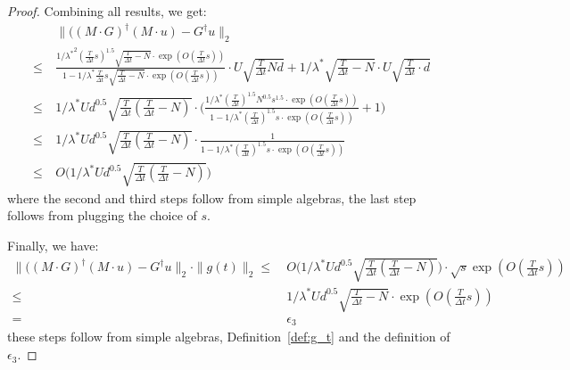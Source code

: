 \begin{proof}
    Combining all results, we get:
    \begin{align*}
        & ~ \| ((M \cdot G)^\dagger (M \cdot u) - G^\dagger u \|_2 \\
        \leq & ~ \frac{{1/\lambda^*}^2 (\frac{T}{\Delta t} s)^{1.5} \sqrt{\frac{T}{\Delta t} - N} \cdot \exp(O(\frac{T}{\Delta t}s))}{1 - {1/\lambda^*} \frac{T}{\Delta t} s \sqrt{\frac{T}{\Delta t} - N}\cdot \exp(O(\frac{T}{\Delta t}s)) } \cdot U \sqrt{\frac{T}{\Delta t} N d} + 1/\lambda^* \sqrt{\frac{T}{\Delta t} - N} \cdot U \sqrt{\frac{T}{\Delta t} \cdot d} \\
        \leq & ~ 1/\lambda^* U d^{0.5}  \sqrt{\frac{T}{\Delta t} (\frac{T}{\Delta t} - N)}  \cdot \Big( \frac{ {1/\lambda^*} (\frac{T}{\Delta t})^{1.5} N^{0.5} s^{1.5}  \cdot \exp(O(\frac{T}{\Delta t}s))}{1 - {1/\lambda^*} (\frac{T}{\Delta t})^{1.5} s \cdot \exp(O(\frac{T}{\Delta t}s))} + 1 \Big) \\
        \leq & ~ 1/\lambda^* U d^{0.5}  \sqrt{\frac{T}{\Delta t} (\frac{T}{\Delta t} - N)}  \cdot  \frac{ 1}{1 - {1/\lambda^*} (\frac{T}{\Delta t})^{1.5} s \cdot \exp(O(\frac{T}{\Delta t}s))}  \\
        \leq & ~ O\Big( 1/\lambda^* U d^{0.5}  \sqrt{\frac{T}{\Delta t} (\frac{T}{\Delta t} - N)}\Big)
    \end{align*}
    where the second and third steps follow from simple algebras, the last step follows from plugging the choice of $s$.

    Finally, we have:
    \begin{align*}
        \| ((M \cdot G)^\dagger (M \cdot u) - G^\dagger u \|_2 \cdot \| g(t) \|_2 
        \leq & ~ O\Big( 1/\lambda^* U d^{0.5}  \sqrt{\frac{T}{\Delta t} (\frac{T}{\Delta t} - N)}\Big) \cdot \sqrt{s} \exp(O(\frac{T}{\Delta t}s)) \\
        \leq & ~ 1/\lambda^* U d^{0.5} \sqrt{\frac{T}{\Delta t} - N} \cdot \exp(O(\frac{T}{\Delta t}s))  \\
        = & ~ \epsilon_3
    \end{align*}
    these steps follow from simple algebras, Definition~\ref{def:g_t} and the definition of $\epsilon_3$.
\end{proof}

